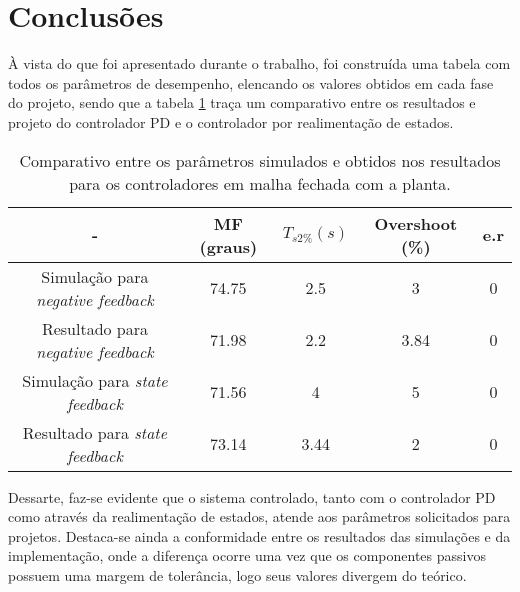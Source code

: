 \section{Conclusões}
À vista do que foi apresentado durante o trabalho, foi construída uma tabela com todos os parâmetros de desempenho, elencando os valores obtidos em cada fase do projeto, sendo que a tabela \ref{table:1} traça um comparativo entre os resultados e projeto do controlador PD e o controlador por realimentação de estados.

\begin{table}[h]
\centering
\caption{Comparativo entre os parâmetros simulados e obtidos nos resultados para os controladores em malha fechada com a planta. }\label{table:1}
\begin{tabular}{c|cccc}
 - & MF (graus) & $T_{s2\%}(s)$ & Overshoot (\%) & e.r  \\ \hline
Simulação para \textit{negative feedback} & 74.75 & 2.5 & 3 & 0  \\
Resultado para \textit{negative feedback} & 71.98 & 2.2 & 3.84 & 0  \\
Simulação para \textit{state feedback} & 71.56 & 4 & 5 & 0  \\
Resultado para \textit{state feedback} & 73.14 & 3.44 & 2 & 0 \\ \hline
\end{tabular}
\end{table}

Dessarte, faz-se evidente que o sistema controlado, tanto com o controlador PD como através da realimentação de estados, atende aos parâmetros solicitados para projetos. Destaca-se ainda a conformidade entre os resultados das simulações e da implementação, onde a diferença ocorre uma vez que os componentes passivos possuem uma margem de tolerância, logo seus valores divergem do teórico.

\pagebreak
